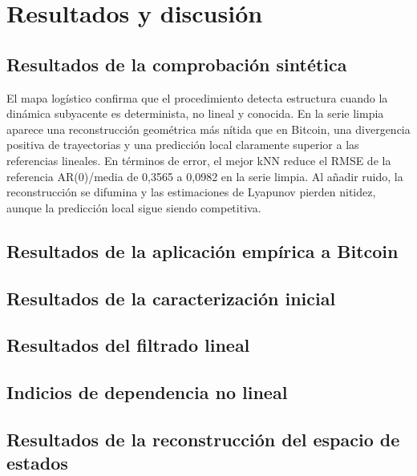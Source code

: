 
\chapter{Resultados y discusión}\label{cap:resultados}

\section{Resultados de la comprobación sintética}\label{sec:resultados-comprobacion-sintetica}
El mapa logístico confirma que el procedimiento detecta estructura cuando la dinámica subyacente es determinista, no lineal y conocida. En la serie limpia aparece una reconstrucción geométrica más nítida que en Bitcoin, una divergencia positiva de trayectorias y una predicción local claramente superior a las referencias lineales. En términos de error, el mejor kNN reduce el RMSE de la referencia AR(0)/media de 0,3565 a 0,0982 en la serie limpia. Al añadir ruido, la reconstrucción se difumina y las estimaciones de Lyapunov pierden nitidez, aunque la predicción local sigue siendo competitiva.

\section{Resultados de la aplicación empírica a Bitcoin}\label{sec:resultados-aplicacion-bitcoin}

\section{Resultados de la caracterización inicial}\label{sec:resultados-caracterizacion}

\section{Resultados del filtrado lineal}\label{sec:resultados-filtrado}

\section{Indicios de dependencia no lineal}\label{sec:evidencia-no-lineal}

\section{Resultados de la reconstrucción del espacio de estados}\label{sec:resultados-reconstruccion}

